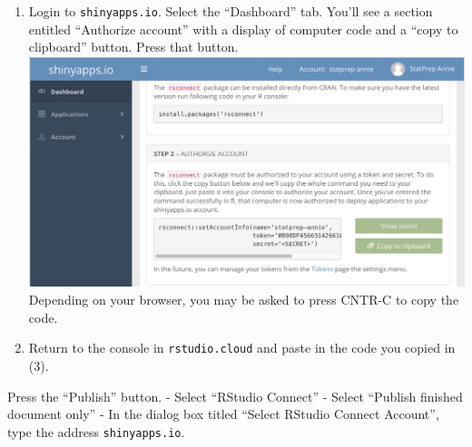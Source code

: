 \documentclass[]{book}
\theoremstyle{definition}
\theoremstyle{definition}
\theoremstyle{definition}
\theoremstyle{remark}
\begin{document}
\begin{enumerate}
\def\labelenumi{\arabic{enumi}.}
\setcounter{enumi}{2}
\item
  Login to \texttt{shinyapps.io}. Select the ``Dashboard'' tab. You'll
  see a section entitled ``Authorize account'' with a display of
  computer code and a ``copy to clipboard'' button. Press that button.
  \includegraphics{images/annie-authorize-cloud2.png} Depending on your
  browser, you may be asked to press CNTR-C to copy the code.
\item
  Return to the console in \texttt{rstudio.cloud} and paste in the code
  you copied in (3).
\end{enumerate}

Press the ``Publish'' button. - Select ``RStudio Connect'' - Select
``Publish finished document only'' - In the dialog box titled ``Select
RStudio Connect Account'', type the address \texttt{shinyapps.io}.


\end{document}
